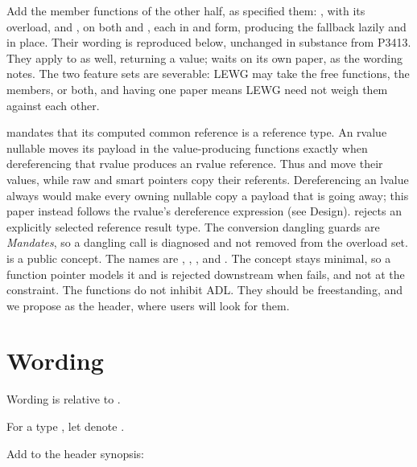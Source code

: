 \documentclass[a4paper,10pt,oneside,openany,final,article]{memoir}
\begin{document}
Add the member functions of the other half, as \cite{P3413R0} specified
them:
, with its  overload,
and , on both  and
, each in  and \tcode{\&\&} form,
producing the fallback lazily and in place. Their wording is reproduced
below, unchanged in substance from P3413. They apply to
 \cite{P2988R12} as well, returning a value;
 waits on its own paper, as the wording notes.
The two feature sets are severable: LEWG may take the free functions, the
members, or both, and having one paper means LEWG need not weigh them
against each other.

 mandates that its computed common reference is a
reference type. An rvalue nullable moves its payload in the value-producing
functions exactly when dereferencing that rvalue produces an rvalue
reference. Thus  and  move their values,
while raw and smart pointers copy their referents. Dereferencing an lvalue
always would make every owning nullable copy a payload that is going away;
this paper instead follows the rvalue's dereference expression (see Design).
 rejects an explicitly selected reference result type.
The conversion dangling guards are \emph{Mandates}, so a
dangling call is diagnosed and not
removed from the overload set.  is a public concept.
The names are , , ,
and . The concept stays minimal, so a function pointer
models it and is rejected downstream when  fails, and not
at the constraint. The functions do not inhibit ADL. They should be
freestanding, and we propose  as the header, where users
will look for them.

\chapter{Wording}

Wording is relative to \cite{N5054}.

For a type , let  denote
.

Add to the  header synopsis:
\end{document}
